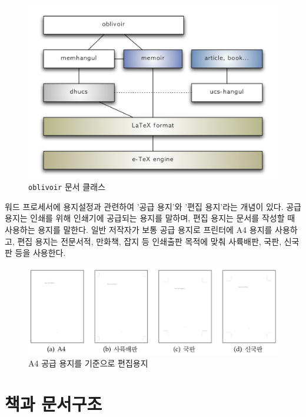 \documentclass[
  letterpaper,
]{book}
\begin{document}
\begin{figure}

{\centering \includegraphics{images/oblivoir.jpg}

}

\caption{\texttt{oblivoir} 문서 클래스}

\end{figure}

워드 프로세서에 용지설정과 관련하여 '공급 용지'와 '편집 용지'라는 개념이
있다. 공급 용지는 인쇄를 위해 인쇄기에 공급되는 용지를 말하며, 편집
용지는 문서를 작성할 때 사용하는 용지를 말한다. 일반 저작자가 보통 공급
용지로 프린터에 A4 용지를 사용하고, 편집 용지는 전문서적, 만화책, 잡지
등 인쇄출판 목적에 맞춰 사륙배판, 국판, 신국판 등을 사용한다.

\begin{figure}

{\centering \includegraphics{images/a4paper.jpg}

}

\caption{A4 공급 용지를 기준으로 편집용지}

\end{figure}

\hypertarget{uxcc45uxacfc-uxbb38uxc11cuxad6cuxc870}{%
\chapter{책과 문서구조}\label{uxcc45uxacfc-uxbb38uxc11cuxad6cuxc870}}
\end{document}
